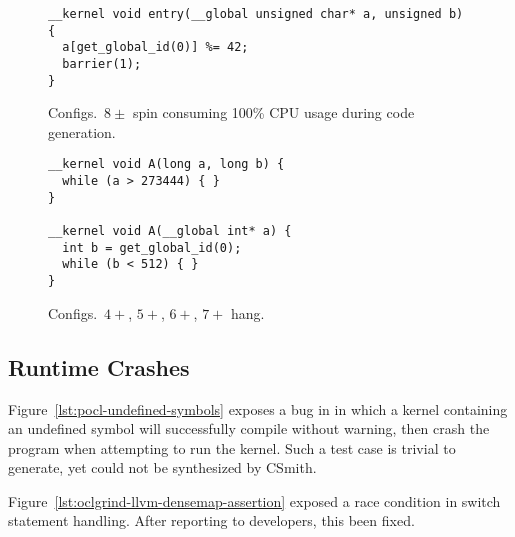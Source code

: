 \begin{figure}
\begin{lstlisting}
__kernel void entry(__global unsigned char* a, unsigned b) {
  a[get_global_id(0)] %= 42;
  barrier(1);
}
\end{lstlisting}
\caption{Configs.\ $8\pm$ spin consuming 100\% CPU usage during code generation.}
\end{figure}

%	

\begin{figure}
\begin{lstlisting}
__kernel void A(long a, long b) {
  while (a > 273444) { }
}

__kernel void A(__global int* a) {
  int b = get_global_id(0);
  while (b < 512) { }
}
\end{lstlisting}
\caption{Configs.\ $4+$, $5+$, $6+$, $7+$ hang.}
\end{figure}

\subsection{Runtime Crashes}

Figure~\ref{lst:pocl-undefined-symbols} exposes a bug in in which a kernel containing an undefined symbol will successfully compile without warning, then crash the program when attempting to run the kernel. Such a test case is trivial to generate, yet could not be synthesized by CSmith.

Figure~\ref{lst:oclgrind-llvm-densemap-assertion} exposed a race condition in switch statement handling. After reporting to developers, this been fixed.

